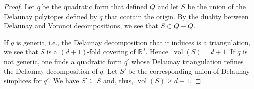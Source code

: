 \documentclass[11pt, a4paper]{amsart}
\newcommand{\RR}{\mathbb{R}}
\DeclareMathOperator{\vol}{vol}
\numberwithin{equation}{section}
\theoremstyle{plain}
\begin{document}
\begin{proof}
Let $q$ be the quadratic form that defined $Q$ and let $S$ be the union of the Delaunay polytopes defined by $q$ that contain the origin. By the duality between Delaunay and Voronoi decompositions, we see that $S\subset Q-Q$.

If $q$ is generic, i.e., the Delaunay decomposition that it induces is a triangulation, we see that $S$ is a $(d+1)$-fold covering of $\RR^d$. Hence, $\vol(S)= d+1$. If $q$ is not generic, one finds a quadratic form $q'$ whose Delaunay triangulation refines the Delaunay decomposition of $q$. Let $S'$ be the corresponding union of Delaunay simplices for $q'$. We have $S' \subseteq S$ and, thus, $\vol(S) \geq d+1$.
\end{proof}




\end{document}
